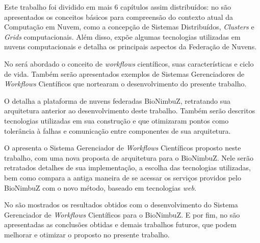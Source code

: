 Este trabalho foi dividido em mais 6 capítulos assim distribuídos: no  são apresentados os conceitos básicos para compreensão do contexto atual da Computação em Nuvem, como a concepção de Sistemas Distribuídos, \textit{Clusters} e \textit{Grids} computacionais. Além disso, expõe algumas tecnologias utilizadas em nuvens computacionais e detalha os principais aspectos da Federação de Nuvens. 

No  será abordado o conceito de \textit{workflows} científicos, suas características e ciclo de vida. Também serão apresentados exemplos de Sistemas Gerenciadores de \textit{Workflows} Científicos que nortearam o desenvolvimento do presente trabalho. 

O  detalha a plataforma de nuvens federadas BioNimbuZ, retratando sua arquitetura anterior ao desenvolvimento deste trabalho. Também serão descritos tecnologias utilizadas em sua construção e que otimizaram pontos como tolerância à falhas e comunicação entre componentes de sua arquitetura.

O  apresenta o Sistema Gerenciador de \textit{Workflows} Científicos proposto neste trabalho, com uma nova proposta de arquitetura para o BioNimbuZ. Nele serão retratados detalhes de sua implementação, a escolha das tecnologias utilizadas, bem como compara a antiga maneira de se acessar os serviços providos pelo BioNimbuZ com o novo método, baseado em tecnologias \textit{web}.

No  são mostrados os resultados obtidos com o desenvolvimento do Sistema Gerenciador de \textit{Workflows} Científicos para o BioNimbuZ. E por fim, no  são apresentadas as conclusões obtidas e demais trabalhos futuros, que podem melhorar e otimizar o proposto no presente trabalho.



